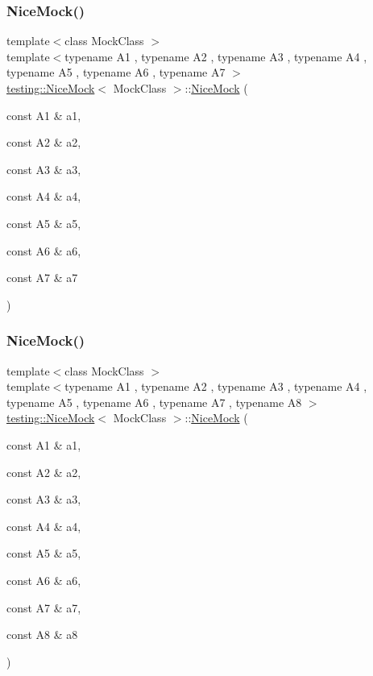 \subsubsection{\texorpdfstring{NiceMock()}{NiceMock()}\hspace{0.1cm}{\footnotesize\ttfamily [14/17]}}
{\footnotesize\ttfamily template$<$class Mock\+Class $>$ \\
template$<$typename A1 , typename A2 , typename A3 , typename A4 , typename A5 , typename A6 , typename A7 $>$ \\
\mbox{\hyperlink{classtesting_1_1_nice_mock}{testing\+::\+Nice\+Mock}}$<$ Mock\+Class $>$\+::\mbox{\hyperlink{classtesting_1_1_nice_mock}{Nice\+Mock}} (\begin{DoxyParamCaption}\item[{const A1 \&}]{a1,  }\item[{const A2 \&}]{a2,  }\item[{const A3 \&}]{a3,  }\item[{const A4 \&}]{a4,  }\item[{const A5 \&}]{a5,  }\item[{const A6 \&}]{a6,  }\item[{const A7 \&}]{a7 }\end{DoxyParamCaption})\hspace{0.3cm}{\ttfamily [inline]}}

\mbox{\label{classtesting_1_1_nice_mock_ae8792aab6c024a50886856bf1093eedc}} 
\subsubsection{\texorpdfstring{NiceMock()}{NiceMock()}\hspace{0.1cm}{\footnotesize\ttfamily [15/17]}}
{\footnotesize\ttfamily template$<$class Mock\+Class $>$ \\
template$<$typename A1 , typename A2 , typename A3 , typename A4 , typename A5 , typename A6 , typename A7 , typename A8 $>$ \\
\mbox{\hyperlink{classtesting_1_1_nice_mock}{testing\+::\+Nice\+Mock}}$<$ Mock\+Class $>$\+::\mbox{\hyperlink{classtesting_1_1_nice_mock}{Nice\+Mock}} (\begin{DoxyParamCaption}\item[{const A1 \&}]{a1,  }\item[{const A2 \&}]{a2,  }\item[{const A3 \&}]{a3,  }\item[{const A4 \&}]{a4,  }\item[{const A5 \&}]{a5,  }\item[{const A6 \&}]{a6,  }\item[{const A7 \&}]{a7,  }\item[{const A8 \&}]{a8 }\end{DoxyParamCaption})\hspace{0.3cm}{\ttfamily [inline]}}

